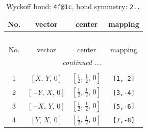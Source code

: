 \documentclass[fleqn,8pt]{jsarticle}
\begin{document}
\renewcommand{\arraystretch}{1.2}
\begin{longtable}{cccc}
\caption{Wyckoff bond: {\tt 4f@1c}, bond symmetry: {\tt 2..}}
 \\
 \hline \hline
No. & vector & center & mapping \\ \hline \endfirsthead

\multicolumn{3}{l}{\tablename\ \thetable{}} \\
 \hline \hline
No. & vector & center & mapping \\ \hline \endhead

 \hline \hline
\multicolumn{3}{r}{\footnotesize\it continued ...} \\ \endfoot

 \hline \hline
\multicolumn{3}{r}{} \\ \endlastfoot

1 & $\left[ X,\, Y,\, 0 \right]$ & $\left[ \frac{1}{2},\, \frac{1}{2},\, 0 \right]$ & {\tt [1,-2]} \\ \hline
2 & $\left[ - Y,\, X,\, 0 \right]$ & $\left[ \frac{1}{2},\, \frac{1}{2},\, 0 \right]$ & {\tt [3,-4]} \\ \hline
3 & $\left[ - X,\, Y,\, 0 \right]$ & $\left[ \frac{1}{2},\, \frac{1}{2},\, 0 \right]$ & {\tt [5,-6]} \\ \hline
4 & $\left[ Y,\, X,\, 0 \right]$ & $\left[ \frac{1}{2},\, \frac{1}{2},\, 0 \right]$ & {\tt [7,-8]} \\
\end{longtable}
\renewcommand{\arraystretch}{1.2}
\end{document}
